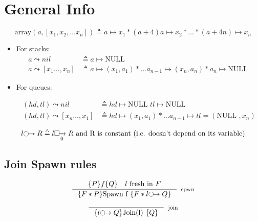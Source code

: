 \documentclass[8pt]{article}
\newcommand{\arr}{\text{array}}
\newcommand{\lock}[2]{ \square \hspace{-1ex} \xrightarrow[#1]{#2}}
\newcommand{\thread}{\ocircle \hspace{-1ex} \rightarrow}
\newcommand{\NULL}{\text{NULL }}
\begin{document}
\section{General Info}
$$ \arr (a, [x_1, x_2, \dots x_n]) \triangleq a \mapsto x_1 \ast (a + 4) a \mapsto x_2 \ast \dots \ast (a +4n) \mapsto x_n$$
\begin{itemize}
\item For stacks:
\begin{align*}
 a \leadsto nil & \triangleq a \mapsto \NULL \\
 a \leadsto [x_1 \dots, x_{n}] &\triangleq a \mapsto (x_1, a_1) \ast \dots a_{n-1} \mapsto (x_n, a_n)\ast a_n\mapsto \NULL
 \end{align*}
\item For queues:

\begin{align*}
(hd, tl) \leadsto nil  &\triangleq hd \mapsto \NULL tl \mapsto \NULL \\
 (hd, tl) \leadsto [x_n \dots, x_{1}] &\triangleq hd \mapsto (x_1, a_1) \ast \dots a_{n-1} \mapsto tl=(\NULL,x_n)
\end{align*}

\end{itemize}

$$l \thread R  \triangleq l \lock{0}{} R \text{ and R is constant (i.e. doesn't depend on its variable)} $$

\subsection{Join Spawn rules}

$$ \inference {\{P\} f \{Q\}  \quad \text{$l$ fresh in $F$}   }{\{F \ast P\} \text{Spawn f } \{F \ast l  \thread Q \}}[spwn]$$

$$ \inference { }{\{ l  \thread Q \} \text{Join(l) } \{ Q \}}[join]$$
\end{document}

